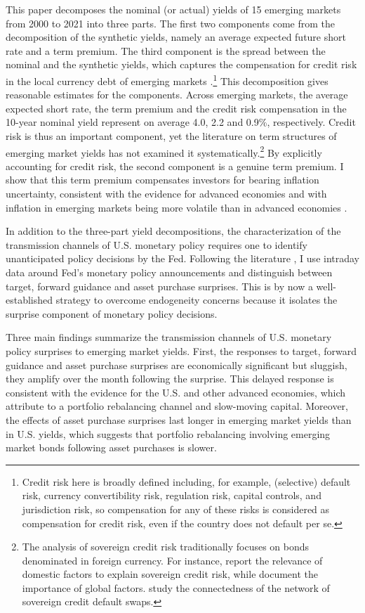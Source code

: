 {This paper decomposes the nominal (or actual) yields of 15 emerging markets from 2000 to 2021 into three parts. The first two components come from the decomposition of the synthetic yields, namely an average expected future short rate and a term premium. The third component is the spread between the nominal and the synthetic yields, which captures the compensation for credit risk in the local currency debt of emerging markets \citep{DuSchreger:2016JoF}.\footnote{ Credit risk here is broadly defined including, for example, (selective) default risk, currency convertibility risk, regulation risk, capital controls, and jurisdiction risk, so compensation for any of these risks is considered as compensation for credit risk, even if the country does not default per se.} 
This decomposition gives reasonable estimates for the components.
Across emerging markets, the average expected short rate, the term premium and the credit risk compensation in the 10-year nominal yield represent on average 4.0, 2.2 and 0.9\%, respectively.
Credit risk is thus an important component, yet the literature on term structures of emerging market yields has not examined it systematically.\footnote{ The analysis of sovereign credit risk traditionally focuses on bonds denominated in foreign currency. For instance, \cite{HilscherNosbusch:2010} report the relevance of domestic factors to explain sovereign credit risk, while \cite{Longstaffetal:2011} document the importance of global factors. \cite{BostanciYilmaz:2020} study the connectedness of the network of sovereign credit default swaps.} By explicitly accounting for credit risk, the second component is a genuine term premium. 
I show that this term premium compensates investors for bearing inflation uncertainty, consistent with the evidence for advanced economies \citep{Wright:2011} and with inflation in emerging markets being more volatile than in advanced economies \citep{HaKoseOhnsorge:2019}. 

In addition to the three-part yield decompositions, the characterization of the transmission channels of U.S. monetary policy requires one to identify unanticipated policy decisions by the Fed. 
Following the literature \citep{Kuttner:2001,GSS:2005a,Swanson:2021}, I use intraday data around Fed's monetary policy announcements and distinguish between target, forward guidance and asset purchase surprises. 
This is by now a well-established strategy to overcome endogeneity concerns because it isolates the surprise component of monetary policy decisions.

Three main findings summarize the transmission channels of U.S. monetary policy surprises to emerging market yields.
First, the responses to target, forward guidance and asset purchase surprises are economically significant but sluggish, they amplify over the month following the surprise. This delayed response is consistent with the evidence for the U.S. and other advanced economies, which \cite{BrooksKatzLustig:2019} attribute to a portfolio rebalancing channel and slow-moving capital. 
Moreover, the effects of asset purchase surprises last longer in emerging market yields than in U.S. yields, which suggests that portfolio rebalancing involving emerging market bonds following asset purchases is slower.

}
